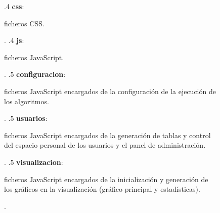 \begin{figure}[H]
{        .4 \textbf{css}: \begin{minipage}[t]{10cm}
            ficheros CSS{.}\\
        \end{minipage}.
        .4 \textbf{js}: \begin{minipage}[t]{10cm}
            ficheros JavaScript{.}\\
        \end{minipage}.
        .5 \textbf{configuracion}: \begin{minipage}[t]{10cm}
            ficheros JavaScript encargados de la configuración de la ejecución de los algoritmos{.}\\
        \end{minipage}.
        .5 \textbf{usuarios}: \begin{minipage}[t]{10cm}
            ficheros JavaScript encargados de la generación de tablas y control del espacio personal de los usuarios y el panel de administración{.}\\
        \end{minipage}.
        .5 \textbf{visualizacion}: \begin{minipage}[t]{10cm}
            ficheros JavaScript encargados de la inicialización y generación de los gráficos en la visualización (gráfico principal y estadísticas){.}\\
        \end{minipage}.
    }
\end{figure}



